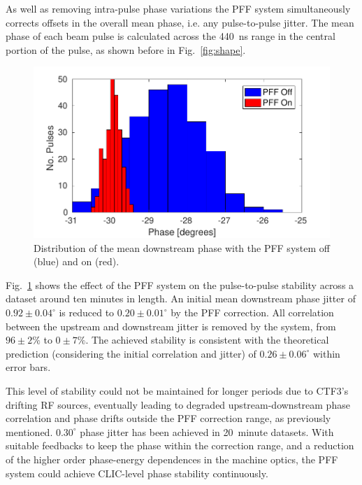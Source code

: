 \documentclass[%
 reprint,
superscriptaddress,
 amsmath,amssymb,
 prl,
]{revtex4-1}
\begin{document}
As well as removing intra-pulse phase variations the PFF system simultaneously 
corrects offsets in the overall mean phase, i.e. any pulse-to-pulse jitter. The 
mean phase of each beam pulse is calculated across the 440~ns range in the 
central portion of the pulse, as shown before in Fig.~\ref{fig:shape}.

\begin{figure}
	\includegraphics[width=\columnwidth]{figs/meanJit}%
	\caption{\label{fig:meanJit}Distribution of the mean downstream phase with 
		the 
		PFF system off (blue) and on (red).}
\end{figure}

Fig.~\ref{fig:meanJit} shows the effect of the PFF system on the pulse-to-pulse 
stability across a dataset around ten minutes in length. An 
initial mean downstream phase jitter of \(0.92\pm0.04^\circ\) is reduced to \(0.20\pm0.01^\circ\) by the PFF 
correction. All correlation between the upstream and downstream jitter is 
removed by the system, from 
\(96\pm2\%\) to \(0\pm7\%\). The achieved stability is consistent with the 
theoretical prediction (considering the initial correlation and jitter) of 
\(0.26\pm0.06^\circ\) within error bars.

This level of stability could not be maintained for longer periods due to 
CTF3's drifting RF sources, eventually leading to degraded 
upstream-downstream phase correlation and phase drifts outside the PFF 
correction range, as previously mentioned. \(0.30^\circ\) phase jitter has been 
achieved in 20~minute datasets. With suitable feedbacks to keep the phase 
within the correction range, and a reduction of the higher order phase-energy 
dependences in the machine optics, the PFF system could achieve CLIC-level 
phase stability continuously.
\end{document}
